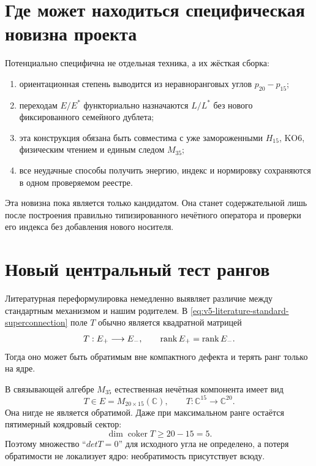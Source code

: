 \section{Где может находиться специфическая новизна проекта}

Потенциально специфична не отдельная техника, а их жёсткая сборка:
\begin{enumerate}
 \item ориентационная степень выводится из неравноранговых углов
 $p_{20}-p_{15}$;
 \item переходам $E/E^*$ функториально назначаются $L/L^*$ без нового
 фиксированного семейного дублета;
 \item эта конструкция обязана быть совместима с уже замороженными
 $H_{15}$, KO6, физическим чтением и единым следом $M_{35}$;
 \item все неудачные способы получить энергию, индекс и нормировку
 сохраняются в одном проверяемом реестре.
\end{enumerate}

Эта новизна пока является только кандидатом. Она станет содержательной
лишь после построения правильно типизированного нечётного оператора и
проверки его индекса без добавления нового носителя.

\section{Новый центральный тест рангов}

Литературная переформулировка немедленно выявляет различие между
стандартным механизмом и нашим родителем. В
\eqref{eq:v5-literature-standard-superconnection} поле $T$ обычно является
квадратной матрицей
\begin{equation}
 T:E_+\longrightarrow E_- ,\qquad
 \operatorname{rank} E_+=\operatorname{rank} E_-.
\end{equation}
Тогда оно может быть обратимым вне компактного дефекта и терять ранг
только на ядре.

В связывающей алгебре $M_{35}$ естественная нечётная компонента имеет вид
\begin{equation}
 T\in E=M_{20\times15}(\mathbb C),
 \qquad T:\mathbb C^{15}\longrightarrow\mathbb C^{20}.
 \label{eq:v5-literature-rectangular-odd-field}
\end{equation}
Она нигде не является обратимой. Даже при максимальном ранге остаётся
пятимерный коядровый сектор:
\begin{equation}
 \dim\operatorname{coker}T\geq20-15=5.
\end{equation}
Поэтому множество ``$det T=0$'' для исходного угла не определено, а
потеря обратимости не локализует ядро: необратимость присутствует всюду.

